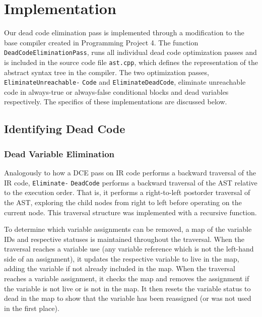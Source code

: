 \documentclass[sigconf]{acmart}
\begin{document}
\section{Implementation}
Our dead code elimination pass is implemented through a modification to the base compiler created in Programming Project 4. The function \verb|DeadCodeEliminationPass|, runs all individual dead code optimization passes and is included in the source code file \verb|ast.cpp|, which defines the representation of the abstract syntax tree in the compiler. The two optimization passes, \verb|EliminateUnreachable-| \verb|Code| and \verb|EliminateDeadCode|, eliminate unreachable code in always-true or always-false conditional blocks and dead variables respectively. The specifics of these implementations are discussed below.

\subsection{Identifying Dead Code}

\subsubsection{Dead Variable Elimination}
Analogously to how a DCE pass on IR code performs a backward traversal of the IR code, \verb|Eliminate-| \verb|DeadCode| performs a backward traversal of the AST relative to the execution order. That is, it performs a right-to-left postorder traversal of the AST, exploring the child nodes from right to left before operating on the current node. This traversal structure was implemented with a recursive function.

To determine which variable assignments can be removed, a map of the variable IDs and respective statuses is maintained throughout the traversal. When the traversal reaches a variable use (any variable reference which is not the left-hand side of an assignment), it updates the respective variable to live in the map, adding the variable if not already included in the map. When the traversal reaches a variable assignment, it checks the map and removes the assignment if the variable is not live or is not in the map. It then resets the variable status to dead in the map to show that the variable has been reassigned (or was not used in the first place).
\end{document}

